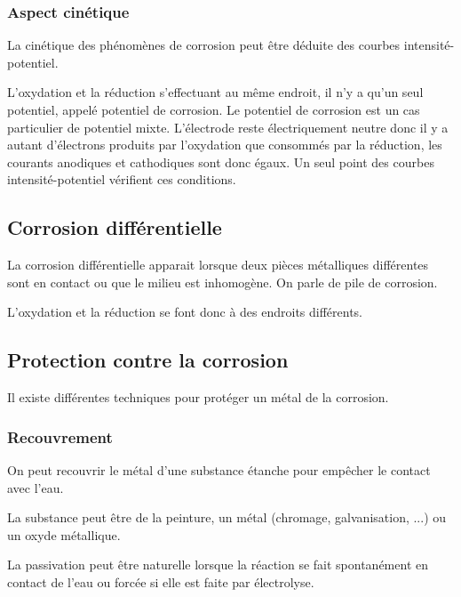 \subsubsection{Aspect cinétique}
La cinétique des phénomènes de corrosion peut être déduite des courbes intensité-potentiel.

L'oxydation et la réduction s'effectuant au même endroit, il n'y a qu'un seul potentiel, appelé potentiel de corrosion. Le potentiel de corrosion est un cas particulier de potentiel mixte. L'électrode reste électriquement neutre donc il y a autant d'électrons produits par l'oxydation que consommés par la réduction, les courants anodiques et cathodiques sont donc égaux. Un seul point des courbes intensité-potentiel vérifient ces conditions.



\subsection{Corrosion différentielle}
La corrosion différentielle apparait lorsque deux pièces métalliques différentes sont en contact ou que le milieu est inhomogène. On parle de pile de corrosion.

L'oxydation et la réduction se font donc à des endroits différents.



\subsection{Protection contre la corrosion}

Il existe différentes techniques pour protéger un métal de la corrosion.

\subsubsection{Recouvrement}
On peut recouvrir le métal d'une substance étanche pour empêcher le contact avec l'eau.

La substance peut être de la peinture, un métal (chromage, galvanisation, ...) ou un oxyde métallique.

La passivation peut être naturelle lorsque la réaction se fait spontanément en contact de l'eau ou forcée si elle est faite par électrolyse.

